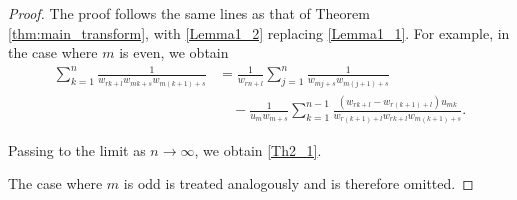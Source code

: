 \documentclass[10pt,a4paper]{amsart}
\begin{document}
\begin{proof}
	The proof follows the same lines as that of Theorem \ref{thm:main_transform}, with \eqref{Lemma1_2} replacing \eqref{Lemma1_1}.
	For example, in the case where $m$ is even, we obtain
	\begin{align*}
		\sum_{k=1}^n
		\frac{1}{w_{rk+l}w_{mk+s}w_{m(k+1)+s}}
		&=
		\frac{1}{w_{rn+l}}
		\sum_{j=1}^n
		\frac{1}{w_{mj+s}w_{m(j+1)+s}}
		\\
		&\quad
		-\frac{1}{u_m w_{m+s}}
		\sum_{k=1}^{n-1}
		\frac{(w_{rk+l}-w_{r(k+1)+l})u_{mk}}
		{w_{r(k+1)+l}w_{rk+l}w_{m(k+1)+s}}.
		\end{align*}
	
	Passing to the limit as $n\to\infty$, we obtain \eqref{Th2_1}.
	
	The case where $m$ is odd is treated analogously and is therefore omitted.
\end{proof}
\end{document}
